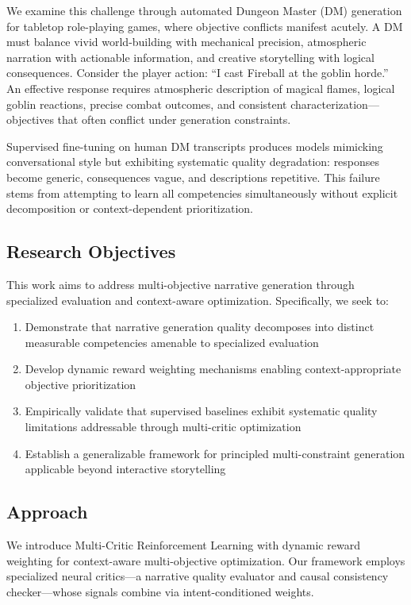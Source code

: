 \documentclass[11pt]{article}
\begin{document}
We examine this challenge through automated Dungeon Master (DM) generation for tabletop role-playing games, where objective conflicts manifest acutely. A DM must balance vivid world-building with mechanical precision, atmospheric narration with actionable information, and creative storytelling with logical consequences. Consider the player action: ``I cast Fireball at the goblin horde.'' An effective response requires atmospheric description of magical flames, logical goblin reactions, precise combat outcomes, and consistent characterization—objectives that often conflict under generation constraints.

Supervised fine-tuning on human DM transcripts produces models mimicking conversational style but exhibiting systematic quality degradation: responses become generic, consequences vague, and descriptions repetitive. This failure stems from attempting to learn all competencies simultaneously without explicit decomposition or context-dependent prioritization.

\subsection{Research Objectives}

This work aims to address multi-objective narrative generation through specialized evaluation and context-aware optimization. Specifically, we seek to:

\begin{enumerate}
\item Demonstrate that narrative generation quality decomposes into distinct measurable competencies amenable to specialized evaluation
\item Develop dynamic reward weighting mechanisms enabling context-appropriate objective prioritization
\item Empirically validate that supervised baselines exhibit systematic quality limitations addressable through multi-critic optimization
\item Establish a generalizable framework for principled multi-constraint generation applicable beyond interactive storytelling
\end{enumerate}

\subsection{Approach}

We introduce Multi-Critic Reinforcement Learning with dynamic reward weighting for context-aware multi-objective optimization. Our framework employs specialized neural critics—a narrative quality evaluator and causal consistency checker—whose signals combine via intent-conditioned weights.
\end{document}
